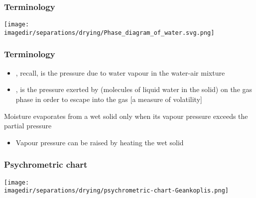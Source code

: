 \begin{frame}\frametitle{Terminology}
	\begin{center}
		\texttt{[image: \\imagedir/separations/drying/Phase\_diagram\_of\_water.svg.png]}
	\end{center}
\end{frame}

\begin{frame}\frametitle{Terminology}
	\begin{itemize}	
		\item	{\color{purple}{Partial pressure}}, recall, is the pressure due to water vapour in the water-air mixture
		\item	{\color{purple}{Vapour pressure}}, is the pressure exerted by (molecules of liquid water in the solid) on the gas phase in order to escape into the gas [a measure of volatility]
	\end{itemize}
	\begin{exampleblock}{}
		Moisture evaporates from a wet solid only when its vapour pressure exceeds the partial pressure
	\end{exampleblock}
	\begin{itemize}
		\item	Vapour pressure can be raised by heating the wet solid
	\end{itemize}
\end{frame}

\begin{frame}\frametitle{Psychrometric chart}
	\vfill
	\begin{center}
		\texttt{[image: \\imagedir/separations/drying/psychrometric-chart-Geankoplis.png]}
	\end{center}
\end{frame}

